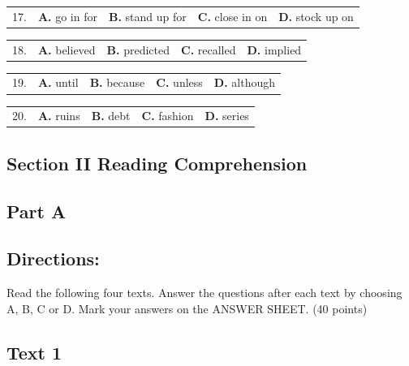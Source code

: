 \documentclass[UTF8,11pt]{ctexart}
\begin{document}
\noindent\begin{tabularx}{\linewidth}{@{}lXXXX@{}}17. & \textbf{A.} go in for & \textbf{B.} stand up for & \textbf{C.} close in on & \textbf{D.} stock up on\\\end{tabularx}\par

\noindent\begin{tabularx}{\linewidth}{@{}lXXXX@{}}18. & \textbf{A.} believed & \textbf{B.} predicted & \textbf{C.} recalled & \textbf{D.} implied\\\end{tabularx}\par

\noindent\begin{tabularx}{\linewidth}{@{}lXXXX@{}}19. & \textbf{A.} until & \textbf{B.} because & \textbf{C.} unless & \textbf{D.} although\\\end{tabularx}\par

\noindent\begin{tabularx}{\linewidth}{@{}lXXXX@{}}20. & \textbf{A.} ruins & \textbf{B.} debt & \textbf{C.} fashion & \textbf{D.} series\\\end{tabularx}\par

\subsection*{\textbf{Section II Reading Comprehension}}


\subsection*{\textbf{Part A}}


\subsection*{\textbf{Directions:}}


Read the following four texts. Answer the questions after each text by choosing A, B, C or D. Mark your answers on the ANSWER SHEET. (40 points)


\subsection*{\textbf{Text 1}}
\end{document}
